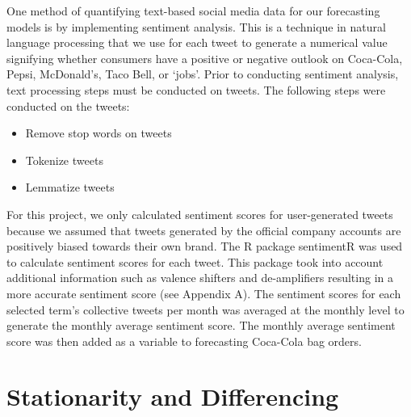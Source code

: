 \documentclass[12pt,oneside]{chicagocapstone}
\providecommand{\tightlist}{%
  \setlength{\itemsep}{0pt}\setlength{\parskip}{0pt}}
\begin{document}
One method of quantifying text-based social media data for our forecasting models is by implementing sentiment analysis. This is a technique in natural language processing that we use for each tweet to generate a numerical value signifying whether consumers have a positive or negative outlook on Coca-Cola, Pepsi, McDonald's, Taco Bell, or `jobs'. Prior to conducting sentiment analysis, text processing steps must be conducted on tweets. The following steps were conducted on the tweets:
\begin{itemize}
\tightlist
\item
  Remove stop words on tweets
\item
  Tokenize tweets
\item
  Lemmatize tweets
\end{itemize}
For this project, we only calculated sentiment scores for user-generated tweets because we assumed that tweets generated by the official company accounts are positively biased towards their own brand. The R package sentimentR was used to calculate sentiment scores for each tweet. This package took into account additional information such as valence shifters and de-amplifiers resulting in a more accurate sentiment score (see Appendix A). The sentiment scores for each selected term's collective tweets per month was averaged at the monthly level to generate the monthly average sentiment score. The monthly average sentiment score was then added as a variable to forecasting Coca-Cola bag orders.

\hypertarget{stationarity-and-differencing}{%
\section*{Stationarity and Differencing}\label{stationarity-and-differencing}}
\end{document}
